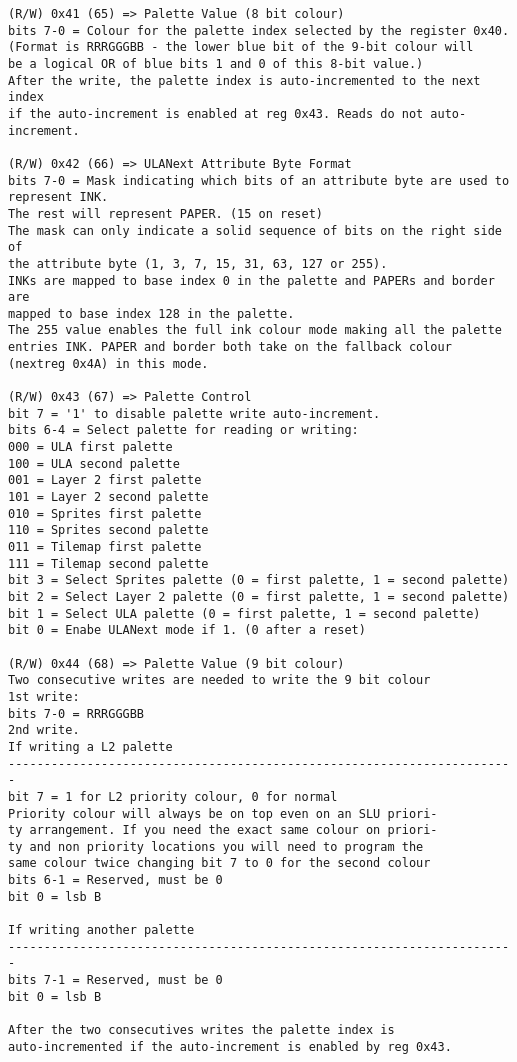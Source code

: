 \begin{verbatim}
(R/W) 0x41 (65) => Palette Value (8 bit colour)
bits 7-0 = Colour for the palette index selected by the register 0x40.
(Format is RRRGGGBB - the lower blue bit of the 9-bit colour will
be a logical OR of blue bits 1 and 0 of this 8-bit value.)
After the write, the palette index is auto-incremented to the next index
if the auto-increment is enabled at reg 0x43. Reads do not auto-increment.

(R/W) 0x42 (66) => ULANext Attribute Byte Format
bits 7-0 = Mask indicating which bits of an attribute byte are used to represent INK.
The rest will represent PAPER. (15 on reset)
The mask can only indicate a solid sequence of bits on the right side of
the attribute byte (1, 3, 7, 15, 31, 63, 127 or 255).
INKs are mapped to base index 0 in the palette and PAPERs and border are
mapped to base index 128 in the palette.
The 255 value enables the full ink colour mode making all the palette
entries INK. PAPER and border both take on the fallback colour
(nextreg 0x4A) in this mode.

(R/W) 0x43 (67) => Palette Control
bit 7 = '1' to disable palette write auto-increment.
bits 6-4 = Select palette for reading or writing:
000 = ULA first palette
100 = ULA second palette
001 = Layer 2 first palette
101 = Layer 2 second palette
010 = Sprites first palette
110 = Sprites second palette
011 = Tilemap first palette
111 = Tilemap second palette
bit 3 = Select Sprites palette (0 = first palette, 1 = second palette)
bit 2 = Select Layer 2 palette (0 = first palette, 1 = second palette)
bit 1 = Select ULA palette (0 = first palette, 1 = second palette)
bit 0 = Enabe ULANext mode if 1. (0 after a reset)

(R/W) 0x44 (68) => Palette Value (9 bit colour)
Two consecutive writes are needed to write the 9 bit colour
1st write:
bits 7-0 = RRRGGGBB
2nd write.
If writing a L2 palette
-----------------------------------------------------------------------
bit 7 = 1 for L2 priority colour, 0 for normal
Priority colour will always be on top even on an SLU priori-
ty arrangement. If you need the exact same colour on priori-
ty and non priority locations you will need to program the
same colour twice changing bit 7 to 0 for the second colour
bits 6-1 = Reserved, must be 0
bit 0 = lsb B

If writing another palette
-----------------------------------------------------------------------
bits 7-1 = Reserved, must be 0
bit 0 = lsb B

After the two consecutives writes the palette index is
auto-incremented if the auto-increment is enabled by reg 0x43.


\end{verbatim}
